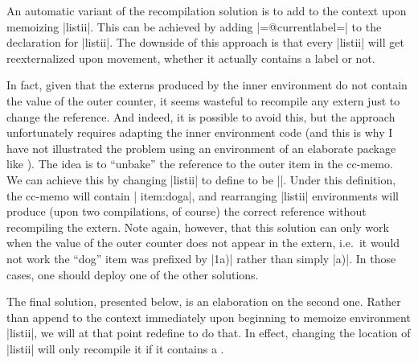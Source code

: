 \documentclass[a4paper,11pt]{article}
\begin{document}
An automatic variant of the recompilation solution is to add 
to the context upon memoizing |listii|.  This can be achieved by adding
|={@currentlabel={}}| to the 
declaration for |listii|. The downside of this approach is that every |listii|
will get reexternalized upon movement, whether it actually contains a label or
not.

In fact, given that the externs produced by the inner environment do not
contain the value of the outer counter, it seems wasteful to recompile any
extern just to change the reference.  And indeed, it is possible to avoid this,
but the approach unfortunately requires adapting the inner environment code
(and this is why I have not illustrated the problem using an environment of an
elaborate package like ).  The idea is to ``unbake'' the
reference to the outer item in the cc-memo.  We can achieve this by changing
|listii| to define  to be |\unexpanded{\thecounti}\thecountii|.
Under this definition, the cc-memo will contain |\mmzLabel
{item:dog}{\thecounti a}|, and rearranging |listii| environments will produce
(upon two compilations, of course) the correct reference without recompiling
the extern.  Note again, however, that this solution can only work when the
value of the outer counter does not appear in the extern, i.e.\ it would not
work the ``dog'' item was prefixed by |1a)| rather than simply |a)|.  In those
cases, one should deploy one of the other solutions.%

The final solution, presented below, is an elaboration on the second one.
Rather than append  to the context immediately upon beginning
to memoize environment |listii|, we will at that point redefine  to do
that.  In effect, changing the location of |listii| will only recompile it if
it contains a .
\end{document}
